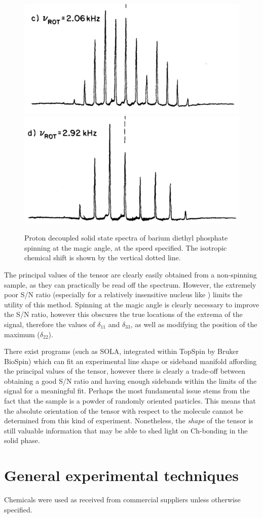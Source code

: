 \begin{refsection}
\begin{figure}
    \includegraphics[width=0.45\linewidth]{Figures/31P-ssnmr-2.06khz.pdf}
    \includegraphics[width=0.45\linewidth]{Figures/31P-ssnmr-2.92khz.pdf}
    \caption[-SS-NMR spinning at the magic angle.]{Proton decoupled solid state  spectra of barium diethyl phosphate spinning at the magic angle, at the speed specified. The isotropic chemical shift is shown by the vertical dotted line.}\label{fig:31P-ssnmr}
\end{figure}

The principal values of the tensor are clearly easily obtained from a non-spinning sample, as they can practically be read off the spectrum.
However, the extremely poor S/N ratio (especially for a relatively insensitive nucleus like ) limits the utility of this method.
Spinning at the magic angle is clearly necessary to improve the S/N ratio, however this obscures the true locations of the extrema of the signal, therefore the values of $ \delta_{11} $ and $ \delta_{33} $, as well as modifying the position of the maximum ($ \delta_{22} $).

There exist programs (such as SOLA, integrated within TopSpin by Bruker BioSpin) which can fit an experimental line shape or sideband manifold affording the principal values of the tensor, however there is clearly a trade-off between obtaining a good S/N ratio and having enough sidebands within the limits of the signal for a meaningful fit.
Perhaps the most fundamental issue stems from the fact that the sample is a powder of randomly oriented particles.
This means that the absolute orientation of the tensor with respect to the molecule cannot be determined from this kind of experiment.
Nonetheless, the \emph{shape} of the tensor is still valuable information that may be able to shed light on Ch-bonding in the solid phase.

\section{General experimental techniques}
Chemicals were used as received from commercial suppliers unless otherwise specified.


\end{refsection}

